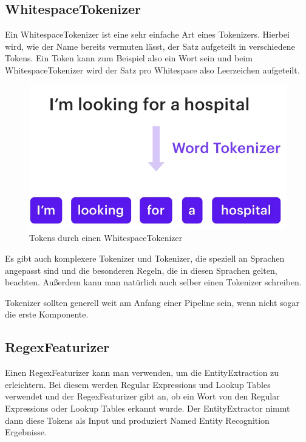 \subsection{WhitespaceTokenizer}

Ein WhitespaceTokenizer ist eine sehr einfache Art eines Tokenizers.
Hierbei wird, wie der Name bereits vermuten lässt, der Satz aufgeteilt in verschiedene Tokens.
Ein Token kann zum Beispiel also ein Wort sein und beim WhitespaceTokenizer wird der Satz pro Whitespace also Leerzeichen aufgeteilt.\cite{whitespaceTokenizer, rasaMasterclassWhitespaceTokenizer, pipelineComponentsYoutube}

\begin{figure}[hbt!]
  \centering
  \includegraphics[scale=0.25]{pics/whitespacetokenizer}
  \caption{Tokens durch einen WhitespaceTokenizer~\cite{pipelineComponentsYoutube}}
  \label{fig:WhitespaceTokenizer}
\end{figure}

Es gibt auch komplexere Tokenizer und Tokenizer, die speziell an Sprachen angepasst sind und die besonderen Regeln, die in diesen Sprachen gelten, beachten.
Außerdem kann man natürlich auch selber einen Tokenizer schreiben.\cite{whitespaceTokenizer, rasaMasterclassWhitespaceTokenizer, pipelineComponentsYoutube}

Tokenizer sollten generell weit am Anfang einer Pipeline sein, wenn nicht sogar die erste Komponente.

\subsection{RegexFeaturizer}

Einen RegexFeaturizer kann man verwenden, um die EntityExtraction zu erleichtern.
Bei diesem werden Regular Expressions und Lookup Tables verwendet und der RegexFeaturizer gibt an, ob ein Wort von den Regular Expressions oder Lookup Tables erkannt wurde.
Der EntityExtractor nimmt dann diese Tokens als Input und produziert Named Entity Recognition Ergebnisse.\cite{rasaMasterclassRegexFeaturizer, pipelineComponentsYoutube, regexFeaturizerCrf}

